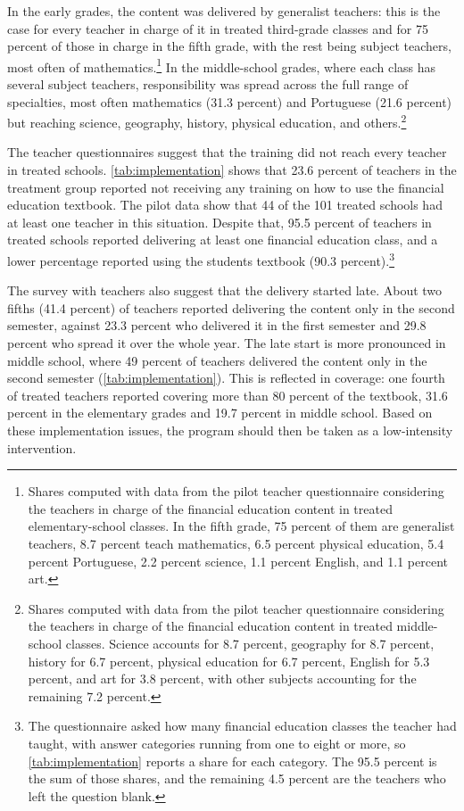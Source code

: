 In the early grades, the content was delivered by generalist teachers: this is the case for every teacher in charge of it in treated third-grade classes and for 75 percent of those in charge in the fifth grade, with the rest being subject teachers, most often of mathematics.\footnote{Shares computed with data from the pilot teacher questionnaire considering the teachers in charge of the financial education content in treated elementary-school classes. In the fifth grade, 75 percent of them are generalist teachers, 8.7 percent teach mathematics, 6.5 percent physical education, 5.4 percent Portuguese, 2.2 percent science, 1.1 percent English, and 1.1 percent art.} In the middle-school grades, where each class has several subject teachers, responsibility was spread across the full range of specialties, most often mathematics (31.3 percent) and Portuguese (21.6 percent) but reaching science, geography, history, physical education, and others.\footnote{Shares computed with data from the pilot teacher questionnaire considering the teachers in charge of the financial education content in treated middle-school classes. Science accounts for 8.7 percent, geography for 8.7 percent, history for 6.7 percent, physical education for 6.7 percent, English for 5.3 percent, and art for 3.8 percent, with other subjects accounting for the remaining 7.2 percent.}

The teacher questionnaires suggest that the training did not reach every teacher in treated schools. \autoref{tab:implementation} shows that 23.6 percent of teachers in the treatment group reported not receiving any training on how to use the financial education textbook. The pilot data show that 44 of the 101 treated schools had at least one teacher in this situation. Despite that, 95.5 percent of teachers in treated schools reported delivering at least one financial education class, and a lower percentage reported using the students textbook (90.3 percent).\footnote{The questionnaire asked how many financial education classes the teacher had taught, with answer categories running from one to eight or more, so \autoref{tab:implementation} reports a share for each category. The 95.5 percent is the sum of those shares, and the remaining 4.5 percent are the teachers who left the question blank.}

The survey with teachers also suggest that the delivery started late. About two fifths (41.4 percent) of teachers reported delivering the content only in the second semester, against 23.3 percent who delivered it in the first semester and 29.8 percent who spread it over the whole year. The late start is more pronounced in middle school, where 49 percent of teachers delivered the content only in the second semester (\autoref{tab:implementation}). This is reflected in coverage: one fourth of treated teachers reported covering more than 80 percent of the textbook, 31.6 percent in the elementary grades and 19.7 percent in middle school. Based on these implementation issues, the program should then be taken as a low-intensity intervention.

